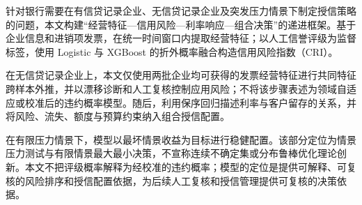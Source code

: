 针对银行需要在有信贷记录企业、无信贷记录企业及突发压力情景下制定授信策略的问题，本文构建“经营特征—信用风险—利率响应—组合决策”的递进框架。基于企业信息和进销项发票，在统一时间窗口内提取经营特征；以人工信誉评级为监督标签，使用 Logistic 与 XGBoost 的折外概率融合构造信用风险指数（CRI）。

在无信贷记录企业上，本文仅使用两批企业均可获得的发票经营特征进行共同特征跨样本外推，并以漂移诊断和人工复核控制应用风险；不将该步骤表述为领域自适应或校准后的违约概率模型。随后，利用保序回归描述利率与客户留存的关系，并将风险、流失、额度与预算约束纳入组合授信配置。

在有限压力情景下，模型以最坏情景收益为目标进行稳健配置。该部分定位为情景压力测试与有限情景最大最小决策，不宣称连续不确定集或分布鲁棒优化理论创新。本文不把评级概率解释为经校准的违约概率；模型的定位是提供可解释、可复核的风险排序和授信配置依据，为后续人工复核和授信管理提供可复核的决策依据。
